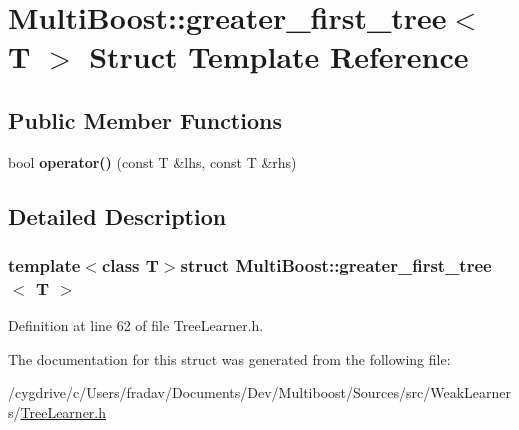 \hypertarget{structMultiBoost_1_1greater__first__tree}{
\section{MultiBoost::greater\_\-first\_\-tree$<$ T $>$ Struct Template Reference}
\label{structMultiBoost_1_1greater__first__tree}
}
\subsection*{Public Member Functions}
\begin{DoxyCompactItemize}
\item 
\hypertarget{structMultiBoost_1_1greater__first__tree_a6a1ca3f8ebfc033a8fc4233beff300a2}{
bool {\bfseries operator()} (const T \&lhs, const T \&rhs)}
\label{structMultiBoost_1_1greater__first__tree_a6a1ca3f8ebfc033a8fc4233beff300a2}

\end{DoxyCompactItemize}


\subsection{Detailed Description}
\subsubsection*{template$<$class T$>$struct MultiBoost::greater\_\-first\_\-tree$<$ T $>$}



Definition at line 62 of file TreeLearner.h.



The documentation for this struct was generated from the following file:\begin{DoxyCompactItemize}
\item 
/cygdrive/c/Users/fradav/Documents/Dev/Multiboost/Sources/src/WeakLearners/\hyperlink{TreeLearner_8h}{TreeLearner.h}\end{DoxyCompactItemize}
